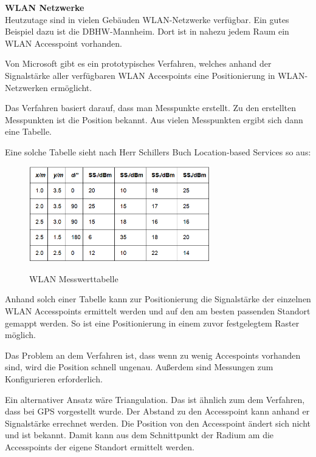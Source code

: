 \textbf{WLAN Netzwerke}\\
Heutzutage sind in vielen Gebäuden WLAN-Netzwerke verfügbar. Ein gutes Beispiel dazu ist die DBHW-Mannheim. Dort ist in nahezu jedem Raum ein WLAN Accesspoint vorhanden.

Von Microsoft gibt es ein prototypisches Verfahren, welches anhand der Signalstärke aller verfügbaren WLAN Accespoints eine Positionierung in WLAN-Netzwerken ermöglicht. 

Das Verfahren basiert darauf, dass man Messpunkte erstellt. Zu den erstellten Messpunkten ist die Position bekannt. Aus vielen Messpunkten ergibt sich dann eine Tabelle.

\cite[S. 210]{Schiller2004}

Eine solche Tabelle sieht nach Herr Schillers Buch Location-based Services so aus:

\begin{figure}[h]
\centering
\includegraphics[width=0.7\textwidth]{ref/images/WLAN_Tabelle.PNG}
\caption[WLAN Messwerttabelle]{WLAN Messwerttabelle}
\cite[S. 210]{Schiller2004}
\end{figure}

Anhand solch einer Tabelle kann zur Positionierung die Signalstärke der einzelnen WLAN Accesspoints ermittelt werden und auf den am besten passenden Standort gemappt werden. So ist eine Positionierung in einem zuvor festgelegtem Raster möglich.

Das Problem an dem Verfahren ist, dass wenn zu wenig Accespoints vorhanden sind, wird die Position schnell ungenau. Außerdem sind Messungen zum Konfigurieren erforderlich. 

Ein alternativer Ansatz wäre Triangulation. Das ist ähnlich zum dem Verfahren, dass bei GPS vorgestellt wurde. Der Abstand zu den Accesspoint kann anhand er Signalstärke errechnet werden. Die Position von den Accesspoint ändert sich nicht und ist bekannt. Damit kann aus dem Schnittpunkt der Radium am die Accesspoints der eigene Standort ermittelt werden.

